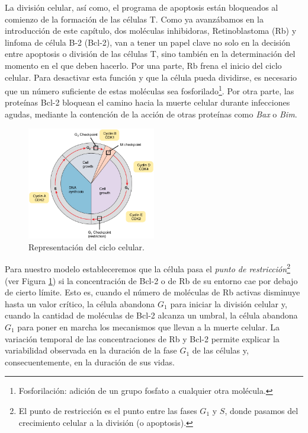 La división celular, así como, el programa de apoptosis están bloqueados al comienzo de la formación de las células T. Como ya avanzábamos en la introducción de este capítulo, dos moléculas inhibidoras, Retinoblastoma (Rb) y linfoma de célula B-2 (Bcl-2), van a tener un papel clave no solo en la decisión entre apoptosis o división de las células T, sino también en la determinación del momento en el que deben hacerlo. Por una parte, Rb frena el inicio del ciclo celular. Para desactivar esta función y que la célula pueda dividirse, es necesario que un número suficiente de estas moléculas sea fosforilado\footnote{Fosforilación: adición de un grupo fosfato a cualquier otra molécula.}.  Por otra parte, las proteínas Bcl-2 bloquean el camino hacia la muerte celular durante infecciones agudas, mediante la contención de la acción de otras proteínas como \textit{Bax} o \textit{Bim}.


\begin{figure}[t]
	\centering
	\includegraphics[width=0.5\textwidth]{Cell_Cycle}
	\caption{Representación del ciclo celular.}
	\label{fig:ciclo celular}
\end{figure}

Para nuestro modelo estableceremos que la célula pasa el \textit{punto de restricción}\footnote{El punto de restricción es el punto entre las fases $G_{1}$ y $S$, donde pasamos del crecimiento celular a la división (o apoptosis).} (ver Figura \ref{fig:ciclo celular}) si la concentración de Bcl-2 o de Rb de su entorno cae por debajo de cierto límite. Esto es, cuando el número de moléculas de Rb activas disminuye hasta un valor crítico, la célula abandona $G_1$ para iniciar la división celular y, cuando la cantidad de moléculas de Bcl-2 alcanza un umbral, la célula abandona $G_1$ para poner en marcha los mecanismos que llevan a la muerte celular. La variación temporal de las concentraciones de Rb y Bcl-2 permite explicar la variabilidad observada en la duración de la fase $G_{1}$ de las células y, consecuentemente, en la duración de sus vidas.

